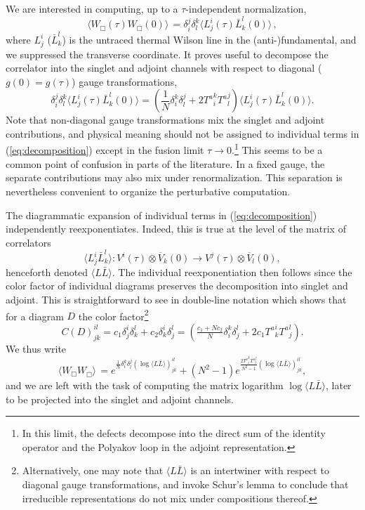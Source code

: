 \documentclass[
 reprint,
 amsmath,
 pre,
 amssymb,
 nofootinbib,
 aps,
 longbibliography,
]{revtex4-1}
\newcommand{\<}{{\langle}}
\renewcommand{\>}{{\rangle}}
\begin{document}
We are interested in computing, up to a $\tau$-independent normalization,
\begin{equation}
     \langle W_{\Box}(\tau) W_{\overline{\Box}}(0)\rangle\, = \delta_i^j\delta_l^k \langle L^i_j(\tau) \bar{L}^l_k(0)\rangle\,, \nonumber
\end{equation}
where $L^i_j$ ($\bar{L}^l_k$) is the untraced thermal Wilson line in the (anti-)fundamental, and we suppressed the transverse coordinate. It proves useful to decompose the correlator into the singlet and adjoint channels with respect to diagonal ($g(0) = g(\tau)$) gauge transformations,
\begin{equation}
    \delta_i^j\delta_l^k \langle L^i_j(\tau) \bar{L}^l_k(0)\rangle = \left(\frac{1}{N}\delta_i^k\delta_l^j  + 2 {T^a}_i^k {T^a}_l^j \right)\langle L^i_j(\tau) \bar{L}^l_k(0)\rangle. \label{eq:decomposition}
\end{equation}
Note that non-diagonal gauge transformations mix the singlet and adjoint contributions, and physical meaning should not be assigned to individual terms in (\ref{eq:decomposition}) except in the fusion limit $\tau \rightarrow 0$.\footnote{In this limit, the defects decompose into the direct sum of the identity operator and the Polyakov loop in the adjoint representation.
} This seems to be a common point of confusion in parts of the literature. In a fixed gauge, the separate contributions may also mix under renormalization. This separation is nevertheless convenient to organize the perturbative computation.

The diagrammatic expansion of individual terms in (\ref{eq:decomposition}) independently reexponentiates. Indeed, this is true at the level of the matrix of correlators $$\langle L^{i}_j \bar{L}^l_k\rangle:V^i(\tau)\otimes\overline{V}_k(0) \rightarrow V^j(\tau)\otimes \overline{V}_l(0),$$ henceforth denoted $\langle L \bar{L}\rangle$. The individual reexponentiation then follows since the color factor of individual diagrams preserves the decomposition into singlet and adjoint. This is straightforward to see in double-line notation which shows that for a diagram $D$ the color factor\footnote{Alternatively, one may note that $\langle L\bar L\rangle$ is an intertwiner with respect to diagonal gauge transformations, and invoke Schur's lemma to conclude that irreducible representations do not mix under compositions thereof.}
$$C(D)^{i l}_{j k} = c_1 \delta^i_j \delta^l_k + c_2 \delta^i_k \delta^l_j= \left(\tfrac{c_1 + N c_2}{N}\delta_i^k\delta_j^l  + 2 c_1 {T^a}_k^i {T^a}_j^l \right).$$
We thus write
\begin{equation}
    \langle W_{\Box} W_{\overline{\Box}}\rangle\, = e^{\tfrac{1}{N}\delta_i^k\delta_l^j (\log\langle L \bar{L}\rangle)^{i l}_{jk}}  + (N^2-1)e^{\tfrac{2{T^a}_i^k {T^a}_l^j}{N^2-1}(\log\langle L \bar{L}\rangle)^{i l}_{jk}}, \label{eq:correlatordecomp}
\end{equation}
and we are left with the task of computing the matrix logarithm $\log\langle L \bar{L}\rangle$, later to be projected into the singlet and adjoint channels.
\end{document}
